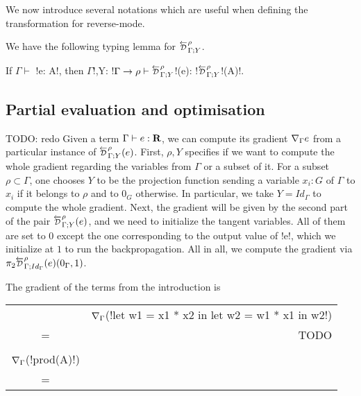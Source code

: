 We now introduce several notations which are useful when defining the transformation for reverse-mode.



We have the following typing lemma for $\directD{\rho}{\Gamma}{Y}$.
\begin{lemma}
    If $\Gamma \vdash$ !e: A!, then $\Gamma$!,Y: !$\Gamma\to \rho \vdash \directD{\rho}{\Gamma}{Y}$!(e): !$\directD{\rho}{\Gamma}{Y}$!(A)!.
\end{lemma}



\subsection{Partial evaluation and optimisation} %
\label{sub:Partial evaluation and optimisation}

TODO: redo
Given a term $\Gamma\vdash e : \mathbf{R}$, we can compute its gradient $\nabla_\Gamma e$ from a particular instance of 
$\directD{\rho}{\Gamma}{Y}(e)$. First, $\rho, Y$ specifies if we want to compute the whole gradient regarding the variables from $\Gamma$ or a subset of it.
For a subset $\rho\subset \Gamma$, one chooses $Y$ to be the projection function sending a variable 
$x_i:G$ of $\Gamma$ to $x_i$ if it belongs to $\rho$ and to $0_G$ otherwise.
In particular, we take $Y=Id_\Gamma$ to compute the whole gradient.
Next, the gradient will be given by the second part of the pair $\directD{\rho}{\Gamma}{Y}(e)$, 
and we need to initialize the tangent variables. All of them are set to $0$ except the one corresponding to the output value of !e!, 
which we initialize at $1$ to run the backpropagation. 
All in all, we compute the gradient via $\pi_2\directD{\rho}{\Gamma}{Id_\Gamma}(e)(0_\Gamma,1)$.

\begin{example}
    The gradient of the terms from the introduction is

    \begin{tabular}{c r}
        & $\nabla_\Gamma$(!let w1 = x1 * x2 in let w2 = w1 * x1 in w2!) \\
        =& TODO \\
        \\
        $\nabla_\Gamma$(!prod(A)!) \\
        =& \\
    \end{tabular}
\end{example}


